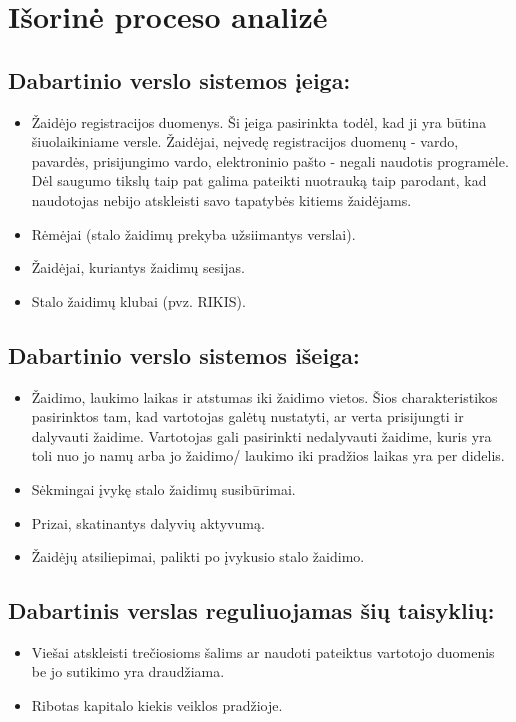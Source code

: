 \documentclass{VUMIFPSkursinis}
\begin{document}
\section{Išorinė proceso analizė}
	\subsection{Dabartinio verslo sistemos įeiga:}
		\renewcommand{\labelitemi}{$\bullet$}
			\begin{itemize}
				\item Žaidėjo registracijos duomenys. Ši įeiga pasirinkta todėl, 
				kad ji yra būtina šiuolaikiniame versle. Žaidėjai, neįvedę 
				registracijos duomenų - vardo, pavardės, prisijungimo vardo, 
				elektroninio pašto - negali naudotis programėle. Dėl saugumo tikslų 
				taip pat galima pateikti nuotrauką taip parodant, kad naudotojas 
				nebijo atskleisti savo tapatybės kitiems žaidėjams.
				\item Rėmėjai (stalo žaidimų prekyba užsiimantys verslai).
				\item Žaidėjai, kuriantys žaidimų sesijas.
				\item Stalo žaidimų klubai (pvz. RIKIS).
			\end{itemize}
	\subsection{Dabartinio verslo sistemos išeiga:}
		\renewcommand{\labelitemi}{$\bullet$}
			\begin{itemize}
				\item Žaidimo, laukimo laikas ir atstumas iki žaidimo vietos. 
				Šios charakteristikos pasirinktos tam, kad vartotojas galėtų 
				nustatyti, ar verta prisijungti ir dalyvauti žaidime. Vartotojas 
				gali pasirinkti nedalyvauti žaidime, kuris yra toli nuo jo namų 
				arba jo žaidimo/ laukimo iki pradžios laikas yra per didelis.
				\item Sėkmingai įvykę stalo žaidimų susibūrimai.
				\item Prizai, skatinantys dalyvių aktyvumą.
				\item Žaidėjų atsiliepimai, palikti po įvykusio stalo žaidimo.
			\end{itemize}
	\subsection{Dabartinis verslas reguliuojamas šių taisyklių:}
		\renewcommand{\labelitemi}{$\bullet$}
			\begin{itemize}
				\item Viešai atskleisti trečiosioms šalims ar naudoti pateiktus 
				vartotojo duomenis be jo sutikimo yra draudžiama.
				\item Ribotas kapitalo kiekis veiklos pradžioje.
			\end{itemize}
\end{document}
